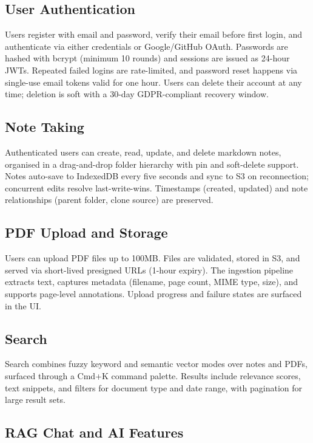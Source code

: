 \documentclass[12pt,a4paper]{article}
\begin{document}
\subsection{User Authentication}

Users register with email and password, verify their email before first login, and authenticate via either credentials or Google/GitHub OAuth. Passwords are hashed with bcrypt (minimum 10 rounds) and sessions are issued as 24-hour JWTs. Repeated failed logins are rate-limited, and password reset happens via single-use email tokens valid for one hour. Users can delete their account at any time; deletion is soft with a 30-day GDPR-compliant recovery window.

\subsection{Note Taking}

Authenticated users can create, read, update, and delete markdown notes, organised in a drag-and-drop folder hierarchy with pin and soft-delete support. Notes auto-save to IndexedDB every five seconds and sync to S3 on reconnection; concurrent edits resolve last-write-wins. Timestamps (created, updated) and note relationships (parent folder, clone source) are preserved.

\subsection{PDF Upload and Storage}

Users can upload PDF files up to 100MB. Files are validated, stored in S3, and served via short-lived presigned URLs (1-hour expiry). The ingestion pipeline extracts text, captures metadata (filename, page count, MIME type, size), and supports page-level annotations. Upload progress and failure states are surfaced in the UI.

\subsection{Search}

Search combines fuzzy keyword and semantic vector modes over notes and PDFs, surfaced through a Cmd+K command palette. Results include relevance scores, text snippets, and filters for document type and date range, with pagination for large result sets.

\subsection{RAG Chat and AI Features}
\end{document}
